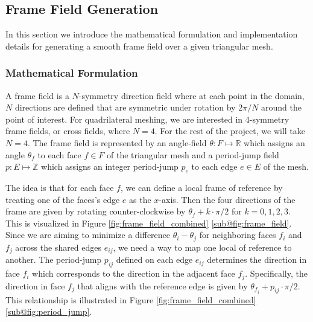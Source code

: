 \documentclass[12pt, letterpaper]{article}
\begin{document}
\subsection{Frame Field Generation}
In this section we introduce the mathematical formulation and implementation details for generating a smooth frame field over a given triangular mesh. 


\subsubsection{Mathematical Formulation}
A frame field is a $N$-symmetry direction field where at each point in the domain, $N$ directions are defined that are symmetric under rotation by $2\pi/N$ around the point of interest. For quadrilateral meshing, we are interested in 4-symmetry frame fields, or cross fields, where $N=4$. For the rest of the project, we will take $N = 4$. The frame field is represented by an angle-field $\theta: F \mapsto \mathbb{R}$ which assigns an angle $\theta_f$ to each face $f \in F$ of the triangular mesh and a period-jump field $p: E \mapsto \mathbb{Z}$ which assigns an integer period-jump $p_e$ to each edge $e \in E$ of the mesh.  

The idea is that for each face $f$, we can define a local frame of reference by treating one of the faces's edge $e$ as the $x$-axis. Then the four directions of the frame are given by rotating counter-clockwise by $\theta_f + k \cdot \pi/2$ for $k = 0, 1, 2, 3$. This is visualized in Figure \ref{fig:frame_field_combined} \ref{sub@fig:frame_field}. Since we are aiming to minimize a difference $\theta_i - \theta_j$ for neighboring faces $f_i$ and $f_j$ across the shared edges $e_{ij}$, we need a way to map one local of reference to another. The period-jump $p_{ij}$ defined on each edge $e_{ij}$ determines the direction in face $f_i$ which corresponds to the direction in the adjacent face $f_j$. Specifically, the direction in face $f_j$ that aligns with the reference edge is given by $\theta_{f_j} + p_{ij} \cdot \pi/2$. This relationship is illustrated in Figure \ref{fig:frame_field_combined} \ref{sub@fig:period_jump}.
\end{document}
